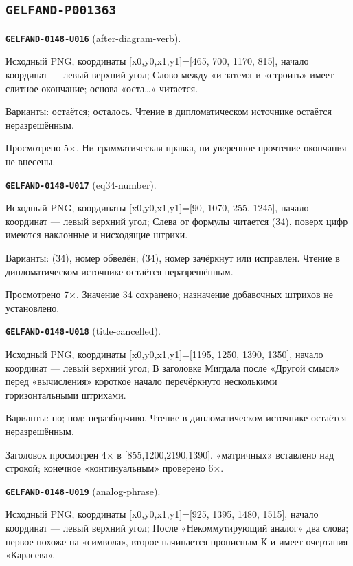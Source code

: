 \documentclass[11pt]{article}
\theoremstyle{definition}
\theoremstyle{remark}
\begin{document}
\subsection*{\texttt{GELFAND-P001363}}
\noindent\leavevmode{}\label{GELFAND-P001363:after-diagram-verb:note}\textbf{\texttt{GELFAND-0148-U016}} (after-diagram-verb).\par\nopagebreak[4]
Исходный PNG, координаты [x0,y0,x1,y1]=[465, 700, 1170, 815], начало координат — левый верхний угол; Слово между «и затем» и «строить» имеет слитное окончание; основа «оста…» читается.\par
Варианты: остаётся; осталось. Чтение в дипломатическом источнике остаётся неразрешённым.\par
Просмотрено 5×. Ни грамматическая правка, ни уверенное прочтение окончания не внесены.\par\medskip
\noindent\leavevmode{}\label{GELFAND-P001363:eq34-number:note}\textbf{\texttt{GELFAND-0148-U017}} (eq34-number).\par\nopagebreak[4]
Исходный PNG, координаты [x0,y0,x1,y1]=[90, 1070, 255, 1245], начало координат — левый верхний угол; Слева от формулы читается (34), поверх цифр имеются наклонные и нисходящие штрихи.\par
Варианты: (34), номер обведён; (34), номер зачёркнут или исправлен. Чтение в дипломатическом источнике остаётся неразрешённым.\par
Просмотрено 7×. Значение 34 сохранено; назначение добавочных штрихов не установлено.\par\medskip
\noindent\leavevmode{}\label{GELFAND-P001363:title-cancelled:note}\textbf{\texttt{GELFAND-0148-U018}} (title-cancelled).\par\nopagebreak[4]
Исходный PNG, координаты [x0,y0,x1,y1]=[1195, 1250, 1390, 1350], начало координат — левый верхний угол; В заголовке Мигдала после «Другой смысл» перед «вычисления» короткое начало перечёркнуто несколькими горизонтальными штрихами.\par
Варианты: по; под; неразборчиво. Чтение в дипломатическом источнике остаётся неразрешённым.\par
Заголовок просмотрен 4× в [855,1200,2190,1390]. «матричных» вставлено над строкой; конечное «континуальным» проверено 6×.\par\medskip
\noindent\leavevmode{}\label{GELFAND-P001363:analog-phrase:note}\textbf{\texttt{GELFAND-0148-U019}} (analog-phrase).\par\nopagebreak[4]
Исходный PNG, координаты [x0,y0,x1,y1]=[925, 1395, 1480, 1515], начало координат — левый верхний угол; После «Некоммутирующий аналог» два слова; первое похоже на «символа», второе начинается прописным К и имеет очертания «Карасева».\par
\end{document}
